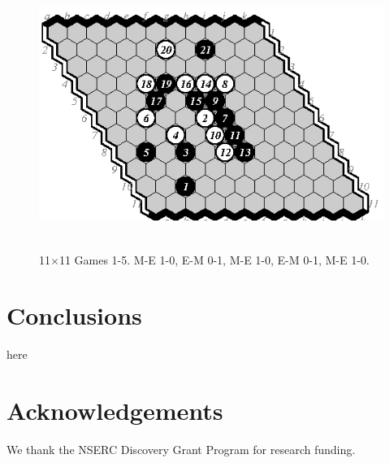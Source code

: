 \documentclass{IOS-Book-Article}
\begin{document}
\begin{figure}
\noindent\hfill\includegraphics[width=.58\columnwidth]{pix/11-05-me}\hfill\ 
\caption{11$\times$11 Games 1-5. M-E 1-0, E-M 0-1, M-E 1-0, E-M 0-1, M-E 1-0.}
\end{figure}

\section{Conclusions}
here

\section*{Acknowledgements}
We thank the NSERC Discovery Grant Program for research funding.


\end{document}
